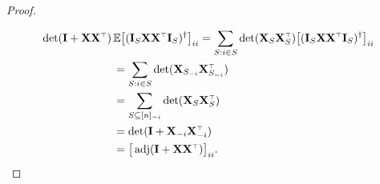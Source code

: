 \documentclass[12pt]{sty/colt2019/colt2018-arxiv}
\begin{document}
\begin{proof}
\begin{align*}
  \end{align*}
  \begin{align*}
\det(\I+\X\X^\top)\,& \E\big[(\I_S\X\X^\top\I_S)^\dagger\big]_{ii}
    = \sum_{S:i\in
    S}\det(\X_S\X_S^\top)
      \big[(\I_S\X\X^\top\I_S)^\dagger\big]_{ii}\\
                    &=\sum_{S:i\in
                      S}\det(\X_{S_{-i}}\X_{S_{-i}}^\top)\\
                    &=\sum_{S\subseteq[n]_{-i}}\det(\X_S\X_S^\top)\\
    &= \det(\I + \X_{-i}\X_{-i}^\top) \\
    &= \big[\adj(\I+\X\X^\top)\big]_{ii}.
\end{align*}    
\end{proof}


\end{document}
